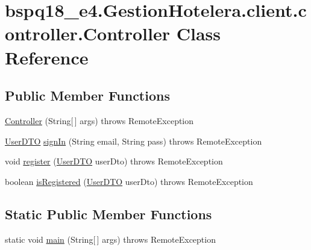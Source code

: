 \hypertarget{classbspq18__e4_1_1_gestion_hotelera_1_1client_1_1controller_1_1_controller}{}\section{bspq18\+\_\+e4.\+Gestion\+Hotelera.\+client.\+controller.\+Controller Class Reference}
\label{classbspq18__e4_1_1_gestion_hotelera_1_1client_1_1controller_1_1_controller}
\subsection*{Public Member Functions}
\begin{DoxyCompactItemize}
\item 
\mbox{\hyperlink{classbspq18__e4_1_1_gestion_hotelera_1_1client_1_1controller_1_1_controller_a855ddd960d55b6c47420a8d29a339ac0}{Controller}} (String\mbox{[}$\,$\mbox{]} args)  throws Remote\+Exception 
\item 
\mbox{\hyperlink{classbspq18__e4_1_1_gestion_hotelera_1_1server_1_1dto_1_1_user_d_t_o}{User\+D\+TO}} \mbox{\hyperlink{classbspq18__e4_1_1_gestion_hotelera_1_1client_1_1controller_1_1_controller_ae3c7ed62d01b30d877beec1c195f4c85}{sign\+In}} (String email, String pass)  throws Remote\+Exception 
\item 
void \mbox{\hyperlink{classbspq18__e4_1_1_gestion_hotelera_1_1client_1_1controller_1_1_controller_a7239e308a1e55caca8424e9d5fdf9378}{register}} (\mbox{\hyperlink{classbspq18__e4_1_1_gestion_hotelera_1_1server_1_1dto_1_1_user_d_t_o}{User\+D\+TO}} user\+Dto)  throws Remote\+Exception 
\item 
boolean \mbox{\hyperlink{classbspq18__e4_1_1_gestion_hotelera_1_1client_1_1controller_1_1_controller_a32b97346269c474a9634fd13361180ee}{is\+Registered}} (\mbox{\hyperlink{classbspq18__e4_1_1_gestion_hotelera_1_1server_1_1dto_1_1_user_d_t_o}{User\+D\+TO}} user\+Dto)  throws Remote\+Exception
\end{DoxyCompactItemize}
\subsection*{Static Public Member Functions}
\begin{DoxyCompactItemize}
\item 
static void \mbox{\hyperlink{classbspq18__e4_1_1_gestion_hotelera_1_1client_1_1controller_1_1_controller_a9d8153deb98e3b0f43affa58619db25e}{main}} (String\mbox{[}$\,$\mbox{]} args)  throws Remote\+Exception 
\end{DoxyCompactItemize}


